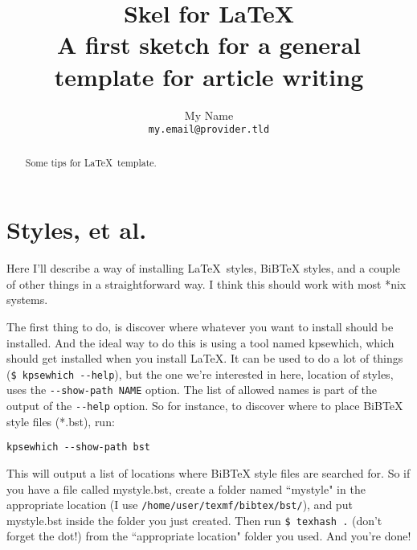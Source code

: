 \documentclass[a4paper,10pt,twocolumn]{article}
\title{\large\textbf{\huge Skel for \LaTeX}\\A first sketch for a general 
template for article writing}
\author{My Name\\\texttt{my.email@provider.tld}}
\date{}
\begin{document}
\maketitle              %


\begin{abstract}
	Some tips for \LaTeX\ template.
\end{abstract}

\section{Styles, et al.}
Here I’ll describe a way of installing \LaTeX\ styles, BiBTeX styles, and a couple 
of other things in a straightforward way. I think this should work with most 
*nix systems.

The first thing to do, is discover where whatever you want to install should be 
installed. And the ideal way to do this is using a tool named kpsewhich, which 
should get installed when you install LaTeX. It can be used to do a lot of 
things\\(\verb+$ kpsewhich --help+), but the one we’re interested in here, 
location of styles, uses the \verb+--show-path NAME+ option. The list of allowed names 
is part of the output of the \verb+--help+ option. So for instance, to discover where to place 
BiBTeX style files (*.bst), run:
\begin{verbatim}
kpsewhich --show-path bst
\end{verbatim}
This will output a list of locations where BiBTeX style files are searched for. 
So if you have a file called mystyle.bst, create a folder named ``mystyle" in the 
appropriate location (I use \verb+/home/user/texmf/bibtex/bst/+), and put mystyle.bst 
inside the folder you just created. Then run \verb+$ texhash .+ (don’t forget the 
dot!) from the ``appropriate location" folder you used. And you're done!
\end{document}
